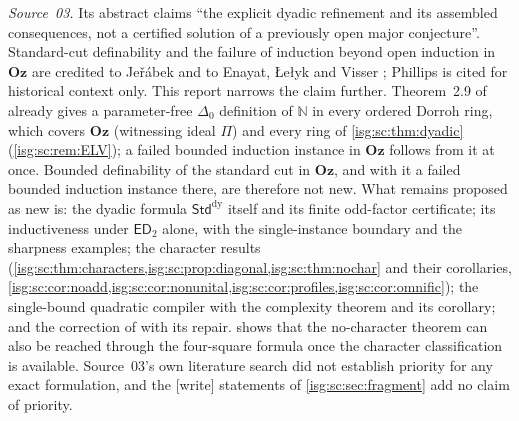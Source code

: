 \documentclass[11pt]{article}
\theoremstyle{definition}
\theoremstyle{remark}
\newcommand{\Oz}{\ensuremath{\mathbf{Oz}}}
\newcommand{\N}{\mathbb{N}}
\newcommand{\StdDy}{\mathsf{Std}^{\mathrm{dy}}}
\newcommand{\ED}{\mathsf{ED}}
\begin{document}
\emph{Source~03.} Its abstract claims ``the explicit dyadic refinement
and its assembled consequences, not a certified solution of a previously
open major conjecture''. Standard-cut definability and the failure of
induction beyond open induction in $\Oz$ are credited to Je\v r\'abek
\cite{JerabekMO} and to Enayat, \L e\l yk and Visser \cite{ELV}; Phillips
\cite{Phillips} is cited for historical context only. This report narrows
the claim further. Theorem~2.9 of \cite{ELV} already gives a
parameter-free $\Delta_0$ definition of $\N$ in every ordered Dorroh ring,
which covers $\Oz$ (witnessing ideal $\Pi$) and every ring of
\cref{isg:sc:thm:dyadic} (\cref{isg:sc:rem:ELV}); a failed bounded
induction instance in $\Oz$ follows from it at once. Bounded
definability of the standard cut in $\Oz$, and with it a failed bounded
induction instance there, are therefore not new. What remains proposed as
new is: the dyadic formula $\StdDy$ itself and its finite odd-factor
certificate; its inductiveness under $\ED_2$ alone, with the
single-instance boundary and the sharpness examples; the character results
(\cref{isg:sc:thm:characters,isg:sc:prop:diagonal,isg:sc:thm:nochar} and
their corollaries, \cref{isg:sc:cor:noadd,isg:sc:cor:nonunital,isg:sc:cor:profiles,isg:sc:cor:omnific});
the single-bound quadratic compiler with the complexity theorem and its
corollary; and the correction of \cite[Lemma~2.7]{ELV} with its repair.
 shows that the no-character theorem can also be
reached through the four-square formula once the character classification
is available. Source~03's own literature search did not establish priority
for any exact formulation, and the \textup{[write]} statements of
\cref{isg:sc:sec:fragment} add no claim of priority.
\end{document}

